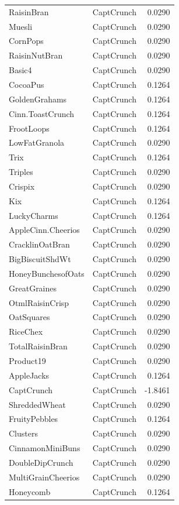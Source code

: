 \begin{longtable}{llr}
RaisinBran & CaptCrunch & 0.0290 \\
Muesli & CaptCrunch & 0.0290 \\
CornPops & CaptCrunch & 0.0290 \\
RaisinNutBran & CaptCrunch & 0.0290 \\
Basic4 & CaptCrunch & 0.0290 \\
CocoaPus & CaptCrunch & 0.1264 \\
GoldenGrahams & CaptCrunch & 0.1264 \\
Cinn.ToastCrunch & CaptCrunch & 0.1264 \\
FrootLoops & CaptCrunch & 0.1264 \\
LowFatGranola & CaptCrunch & 0.0290 \\
Trix & CaptCrunch & 0.1264 \\
Triples & CaptCrunch & 0.0290 \\
Crispix & CaptCrunch & 0.0290 \\
Kix & CaptCrunch & 0.1264 \\
LuckyCharms & CaptCrunch & 0.1264 \\
AppleCinn.Cheerios & CaptCrunch & 0.0290 \\
CracklinOatBran & CaptCrunch & 0.0290 \\
BigBiscuitShdWt & CaptCrunch & 0.0290 \\
HoneyBunchesofOats & CaptCrunch & 0.0290 \\
GreatGraines & CaptCrunch & 0.0290 \\
OtmlRaisinCrisp & CaptCrunch & 0.0290 \\
OatSquares & CaptCrunch & 0.0290 \\
RiceChex & CaptCrunch & 0.0290 \\
TotalRaisinBran & CaptCrunch & 0.0290 \\
Product19 & CaptCrunch & 0.0290 \\
AppleJacks & CaptCrunch & 0.1264 \\
CaptCrunch & CaptCrunch & -1.8461 \\
ShreddedWheat & CaptCrunch & 0.0290 \\
FruityPebbles & CaptCrunch & 0.1264 \\
Clusters & CaptCrunch & 0.0290 \\
CinnamonMiniBuns & CaptCrunch & 0.0290 \\
DoubleDipCrunch & CaptCrunch & 0.0290 \\
MultiGrainCheerios & CaptCrunch & 0.0290 \\
Honeycomb & CaptCrunch & 0.1264 \\

\end{longtable}

